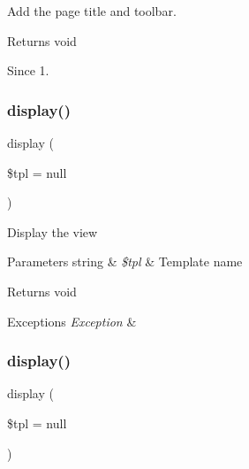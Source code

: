 Add the page title and toolbar.

\begin{DoxyReturn}{Returns}
void
\end{DoxyReturn}
\begin{DoxySince}{Since}
1. 
\end{DoxySince}
\mbox{\label{classtks__agenda_view_newsitems_aa988850da0dbeb9875debea0280754d5}} 
\subsubsection{display()\hspace{0.1cm}{\footnotesize\ttfamily [1/2]}}
{\footnotesize\ttfamily display (\begin{DoxyParamCaption}\item[{}]{\$tpl = {\ttfamily null} }\end{DoxyParamCaption})}

Display the view


\begin{DoxyParams}[1]{Parameters}
string & {\em \$tpl} & Template name\\
\hline
\end{DoxyParams}
\begin{DoxyReturn}{Returns}
void
\end{DoxyReturn}

\begin{DoxyExceptions}{Exceptions}
{\em Exception} & \\
\hline
\end{DoxyExceptions}
\mbox{\label{classtks__agenda_view_newsitems_aa988850da0dbeb9875debea0280754d5}} 
\subsubsection{display()\hspace{0.1cm}{\footnotesize\ttfamily [2/2]}}
{\footnotesize\ttfamily display (\begin{DoxyParamCaption}\item[{}]{\$tpl = {\ttfamily null} }\end{DoxyParamCaption})}

